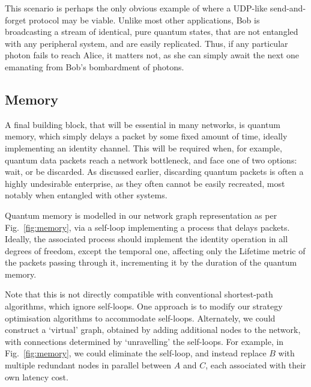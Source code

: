\documentclass[aps,rmp,twocolumn,amsmath,amssymb,nofootinbib,superscriptaddress,longbibliography,floatfix]{revtex4-1}
\begin{document}
This scenario is perhaps the only obvious example of where a UDP-like send-and-forget protocol may be viable. Unlike most other applications, Bob is broadcasting a stream of identical, pure quantum states, that are not entangled with any peripheral system, and are easily replicated. Thus, if any particular photon fails to reach Alice, it matters not, as she can simply await the next one emanating from Bob's bombardment of photons.

%
%

\subsection{Memory} \label{sec:memory}

A final building block, that will be essential in many networks, is quantum memory, which simply delays a packet by some fixed amount of time, ideally implementing an identity channel. This will be required when, for example, quantum data packets reach a network bottleneck, and face one of two options: wait, or be discarded. As discussed earlier, discarding quantum packets is often a highly undesirable enterprise, as they often cannot be easily recreated, most notably when entangled with other systems.

Quantum memory is modelled in our network graph representation as per Fig.~\ref{fig:memory}, via a self-loop implementing a process that delays packets. Ideally, the associated process should implement the identity operation in all degrees of freedom, except the temporal one, affecting only the {\sc Lifetime} metric of the packets passing through it, incrementing it by the duration of the quantum memory.

Note that this is not directly compatible with conventional shortest-path algorithms, which ignore self-loops. One approach is to modify our strategy optimisation algorithms to accommodate self-loops. Alternately, we could construct a `virtual' graph, obtained by adding additional nodes to the network, with connections determined by `unravelling' the self-loops. For example, in Fig.~\ref{fig:memory}, we could eliminate the self-loop, and instead replace $B$ with multiple redundant nodes in parallel between $A$ and $C$, each associated with their own latency cost.
\end{document}
